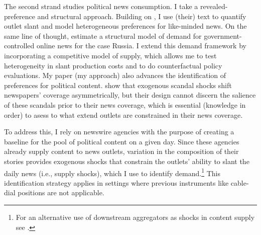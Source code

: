 \documentclass[12pt]{article}
\begin{document}
	The second strand studies political news consumption. I take a revealed-preference and structural approach. Building on \citet{gentzkow2010media}, I use (their) text to quantify outlet slant and model heterogeneous preferences for like-minded news. On the same line of thought, \citet{SimonovRao2022} estimate a structural model of demand for government-controlled online news for the case Russia. I extend this demand framework by incorporating a competitive model of supply, which allows me to test heterogeneity in slant production costs and to do counterfactual policy evaluations. My paper (my approach) also advances the identification of preferences for political content. \citet{Puglisi2011NewspaperCO} show that exogenous scandal shocks shift newspapers’ coverage asymmetrically, but their design cannot discern the salience of these scandals prior to their news coverage, which is essential (knowledge in order) to asess to what extend outlets are constrained in their news coverage.
	
	

		To address this, I rely on newswire agencies with the purpose of creating a baseline for the pool of political content on a given day. Since these agencies already supply content to news outlets, variation in the composition of their stories provides exogenous shocks that constrain the outlets’ ability to slant the daily news (i.e., supply shocks), which I use to identify demand.\footnote{For an alternative use of downstream aggregators as shocks in content supply see \cite{milena}.} This identification strategy applies in settings where previous instruments like cable-dial positions \citep{martin2017} are not applicable.
	
	
	
\end{document}
